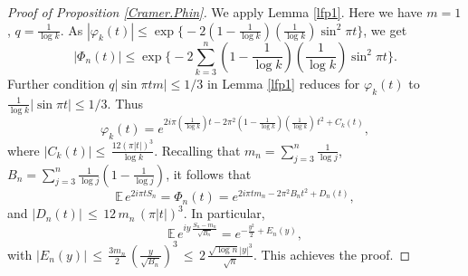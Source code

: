 \documentclass[11pt,draft,reqno]{amsart}
\theoremstyle{definition}
\theoremstyle{remarks}
\numberwithin{equation}{section}
\def \p{{\varphi}}
\def\E{{\mathbb E \,}}
\begin{document}
 \begin{proof}[Proof of Proposition \ref{Cramer.Phin}]
   
We apply Lemma \ref{lfp1}. Here we have $m=1$, $q=\frac{1}{\log k}$. As $|{\varphi}_k(t)|\le \exp\big\{- 2(1-\frac{1}{\log k})(\frac{1}{\log k})\sin^2\pi t  \big\}$, we get 
 $$|\Phi_n(t)|\le \exp\big\{- 2\sum_{k=3}^n(1-\frac{1}{\log k})(\frac{1}{\log k})\sin^2\pi t  \big\}.$$
Further condition $q|\sin \pi t m|\le 1/3$ in Lemma \ref{lfp1}  reduces for $\p_k(t)$ to 
$ \frac{1}{\log k}|\sin \pi t  |\le 1/3$.  Thus 
\begin{equation}
  \label{chf.xik}
  \p_k (t)= e^{ 2i \pi    ( \frac{1}{\log k}) t - 2\pi^2  (1-\frac{1}{\log k})(\frac{1}{\log k} ) \,t^2  + C_k(t)  },
\end{equation}
where
 $|C_k(t)|
\le\, \frac{12  (\pi  |t|)^3}{\log k}$. 
  Recalling that $m_n =\sum_{j=3}^n \frac1{\log j}$, $B_n= \sum_{j=3}^n \frac1{\log j}(1-\frac1{\log j})$, it follows that 
\begin{equation}
  \label{chf.sn}
\E e^{2i\pi tS_n}=  \Phi_n (t)= e^{ 2i \pi tm_n -  2\pi^2  B_n  t^2  + D_n(t)  },
\end{equation}
and
$|D_n(t)| \,\le\,  12\,m_n\, (\pi  |t|)^3  $. 
In particular,  
 \begin{equation}
  \label{chf.sn1}
 \E e^{ iy\, \frac{S_n-m_n}{\sqrt {B_n}} }= e^{    - \frac{y^2}{2}    + E_n(y)  },
 \end{equation}
with  $|E_n(y)| \,\le\,  \frac{3m_n}{2} \, (\frac{y}{\sqrt {B_n}})^3\,\le\,  2 \, \frac{\sqrt {\log n}|y|^3}{\sqrt {n}}  $. 
  This achieves the proof.
\end{proof}
 
\end{document}
